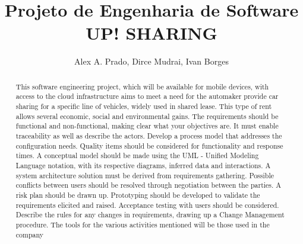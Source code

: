 \documentclass[12pt]{article}
\title{Projeto de Engenharia de Software \\ UP! SHARING}
\author{Alex A. Prado\inst{1}, Dirce Mudrai\inst{1}, Ivan Borges\inst{1} \email{alex.azprado@gmail.com, dirce.mudrai@icloud.com,
  ivangb@gmail.com}}
\begin{document}
 

\maketitle

\begin{abstract}

This software engineering project, which will be available for mobile devices, with access to the cloud infrastructure aims to meet a need for the automaker provide car sharing for a specific line of vehicles, widely used in shared lease. This type of rent allows several economic, social and environmental gains.
The requirements should be functional and non-functional, making clear what your objectives are. It must enable traceability as well as describe the actors.
Develop a process model that addresses the configuration needs. Quality items should be considered for functionality and response times. A conceptual model should be made using the UML - Unified Modeling Language notation, with its respective diagrams, inferred data and interactions.
A system architecture solution must be derived from requirements gathering. Possible conflicts between users should be resolved through negotiation between the parties. A risk plan should be drawn up. Prototyping should be developed to validate the requirements elicited and raised. Acceptance testing with users should be considered. Describe the rules for any changes in requirements, drawing up a Change Management procedure. The tools for the various activities mentioned will be those used in the company
 
\end{abstract}
     
\end{document}
